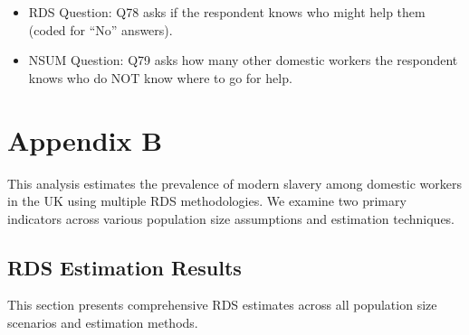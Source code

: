 \documentclass[
  12pt,
  letterpaper,
  DIV=11,
  numbers=noendperiod]{scrartcl}
\providecommand{\tightlist}{%
  \setlength{\itemsep}{0pt}\setlength{\parskip}{0pt}}
\theoremstyle{plain}
\theoremstyle{definition}
\begin{document}
\begin{itemize}
  \begin{itemize}
  \tightlist
  \item
    RDS Question: Q78 asks if the respondent knows who might help them
    (coded for ``No'' answers).
  \item
    NSUM Question: Q79 asks how many other domestic workers the
    respondent knows who do NOT know where to go for help.
  \end{itemize}
\end{itemize}

\section{Appendix B}\label{app-sens}

This analysis estimates the prevalence of modern slavery among domestic
workers in the UK using multiple RDS methodologies. We examine two
primary indicators across various population size assumptions and
estimation techniques.

\subsection{RDS Estimation Results}\label{rds-estimation-results}

This section presents comprehensive RDS estimates across all population
size scenarios and estimation methods.
\end{document}
